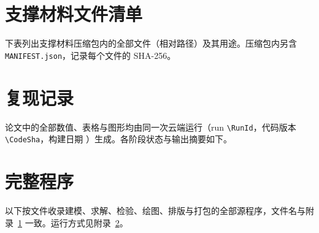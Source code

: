 \documentclass[UTF8,zihao=-4,fontset=none,a4paper]{ctexart}
\theoremstyle{definition}
\begin{document}
\section{支撑材料文件清单}
\label{app:support}
下表列出支撑材料压缩包内的全部文件（相对路径）及其用途。压缩包内另含 \nolinkurl{MANIFEST.json}，记录每个文件的 SHA-256。


\section{复现记录}
\label{app:repro}
论文中的全部数值、表格与图形均由同一次云端运行（run \nolinkurl{\RunId}，代码版本 \nolinkurl{\CodeSha}，构建日期 \BuildDate）生成。各阶段状态与输出摘要如下。



\section{完整程序}
\label{app:code}
以下按文件收录建模、求解、检验、绘图、排版与打包的全部源程序，文件名与附录~\ref{app:support} 一致。运行方式见附录~\ref{app:repro}。

\end{document}
